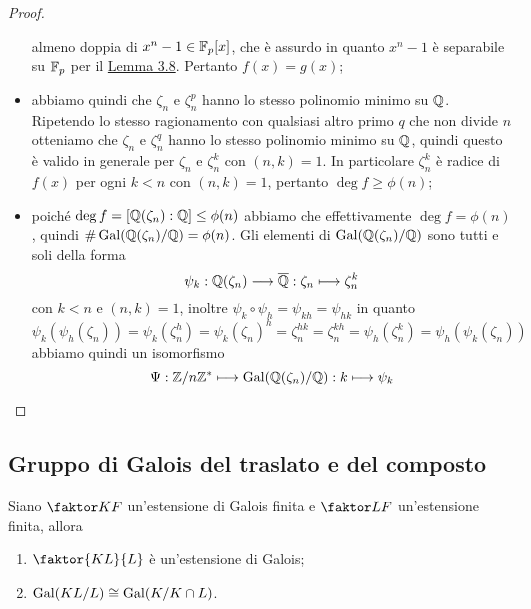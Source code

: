 \documentclass[11pt]{scrartcl}
\begin{document}
\begin{proof}
\begin{itemize}
        almeno doppia di $x^n - 1 \in \mathbb F_p[x]$, che è assurdo in quanto $x^n -1$
        è separabile su $\mathbb F_p$ per il \hyperref[lemma3.8]{Lemma 3.8}. Pertanto 
        $f(x) = g(x)$;
        \item abbiamo quindi che $\zeta_n$ e $\zeta_n^p$ hanno lo stesso polinomio 
        minimo su $\mathbb Q$. Ripetendo lo stesso ragionamento con qualsiasi altro 
        primo $q$ che non divide $n$ otteniamo che $\zeta_n$ e $\zeta_n^q$ 
        hanno lo stesso polinomio minimo su $\mathbb Q$, quindi questo è valido 
        in generale per $\zeta_n$ e $\zeta_n^k$ con $(n, k) = 1$. In particolare
        $\zeta_n^k$ è radice di $f(x)$ per ogni $k < n$ con $(n, k) = 1$, pertanto 
        $\deg f \geq \phi(n)$;
        \item poiché $\deg f = [\mathbb Q(\zeta_n):\mathbb Q] \leq \phi(n)$ abbiamo che 
        effettivamente $\deg f = \phi(n)$, quindi $\#\operatorname{Gal}(\mathbb Q(\zeta_n)/\mathbb Q) = \phi(n)$.
        Gli elementi di $\operatorname{Gal}(\mathbb Q(\zeta_n)/\mathbb Q)$ sono tutti e soli della forma
        \[
            \psi_k: \mathbb Q(\zeta_n)\longrightarrow \overline{\mathbb Q}: \zeta_n \longmapsto \zeta_n^k
        \]
        con $k < n$ e $(n, k) = 1$, inoltre $\psi_k\circ\psi_h = \psi_{kh} = \psi_{hk}$
        in quanto 
        \[
            \psi_k(\psi_h(\zeta_n)) = \psi_k(\zeta_n^h) = \psi_k(\zeta_n)^h =
            \zeta_n^{hk} = \zeta_n^{kh} = \psi_h(\zeta_n^k) = \psi_h(\psi_k(\zeta_n))
        \]
        abbiamo quindi un isomorfismo 
        \[
            \Psi: {\mathbb Z}/n{\mathbb Z}^* \longmapsto \operatorname{Gal}(\mathbb Q(\zeta_n)/\mathbb Q):k \longmapsto \psi_k
        \]
    \end{itemize}
\end{proof}

\newpage

\subsection{Gruppo di Galois del traslato e del composto}

\begin{proposition}
    \label{prop3.10}
    Siano $\faktor K F$ un'estensione di Galois finita e $\faktor L F$ un'estensione
    finita, allora
    \begin{enumerate}[(1)]
        \item $\faktor{KL}{L}$ è un'estensione di Galois;
        \item $\operatorname{Gal}(KL/L) \cong \operatorname{Gal}(K/K\cap L)$.
    \end{enumerate}
\end{proposition}
\end{document}
